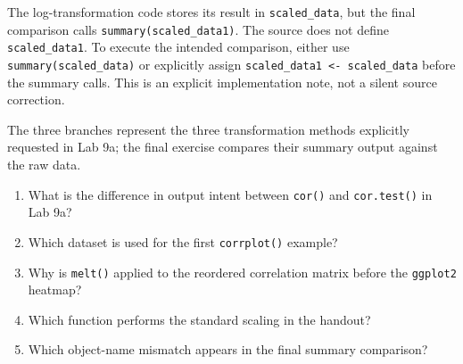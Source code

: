 \begin{pitfall}
The log-transformation code stores its result in \texttt{scaled\_data}, but the final comparison calls \texttt{summary(scaled\_data1)}. The source does not define \texttt{scaled\_data1}. To execute the intended comparison, either use \texttt{summary(scaled\_data)} or explicitly assign \texttt{scaled\_data1 <- scaled\_data} before the summary calls. This is an explicit implementation note, not a silent source correction.
\end{pitfall}

\begin{dsfigure}
\end{dsfigure}

The three branches represent the three transformation methods explicitly requested in Lab 9a; the final exercise compares their summary output against the raw data.

\begin{quickcheck}
\begin{enumerate}
  \item What is the difference in output intent between \texttt{cor()} and \texttt{cor.test()} in Lab 9a?
  \item Which dataset is used for the first \texttt{corrplot()} example?
  \item Why is \texttt{melt()} applied to the reordered correlation matrix before the \texttt{ggplot2} heatmap?
  \item Which function performs the standard scaling in the handout?
  \item Which object-name mismatch appears in the final summary comparison?
\end{enumerate}
\end{quickcheck}

